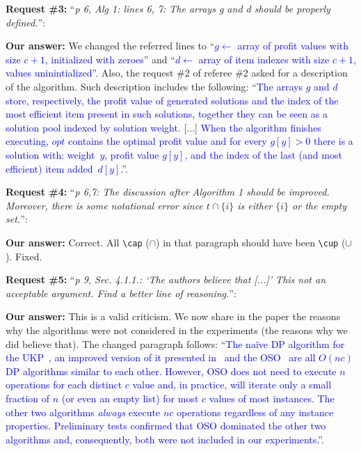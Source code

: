 \documentclass{elsarticle}
\begin{document}
\textbf{Request \#3:} ``\textit{p 6, Alg 1: lines 6, 7: The arrays g and d should be properly defined.}'':

\textbf{Our answer:} We changed the referred lines to ``\textcolor{blue}{\(g \leftarrow\) array of profit values with size \(c + 1\), initialized with zeroes}'' and ``\textcolor{blue}{\(d \leftarrow\) array of item indexes with size \(c + 1\), values uninintialized}''.
Also, the request \#2 of referee \#2 asked for a description of the algorithm.
Such description includes the following: ``\textcolor{blue}{The arrays \(g\) and \(d\) store, respectively, the profit value of generated solutions and the index of the most efficient item present in such solutions, together they can be seen as a solution pool indexed by solution weight.} [...] \textcolor{blue}{When the algorithm finishes executing, \(opt\) contains the optimal profit value and for every \(g[y] > 0\) there is a solution with: weight~\(y\), profit value \(g[y]\), and the index of the last (and most efficient) item added~\(d[y]\).}''.
\medskip

\textbf{Request \#4:} ``\textit{p 6,7: The discussion after Algorithm 1 should be improved. Moreover, there is some notational error since \(t \cap \{i\}\)  is either \(\{i\}\) or the empty set.}'':

\textbf{Our answer:} Correct. All \verb+\cap+ (\(\cap\)) in that paragraph should have been \verb+\cup+ (\(\cup\)). Fixed.
\medskip

\textbf{Request \#5:} ``\textit{p 9, Sec. 4.1.1.: `The authors believe that [...]' This not an acceptable argument. Find a better line of reasoning.}'':

\textbf{Our answer:} This is a valid criticism.
We now share in the paper the reasons why the algorithms were not considered in the experiments (the reasons why we did believe that).
The changed paragraph follows: ``\textcolor{blue}{The naïve DP algorithm for the UKP~\cite[p.~311]{tchu}, an improved version of it presented in~\cite[p.~221]{garfinkel} and the OSO~\cite[p.~15]{gg-66} are all \(O(nc)\) DP algorithms similar to each other. %
However, OSO does not need to execute \(n\) operations for each distinct \(c\) value and, in practice, will iterate only a small fraction of \(n\) (or even an empty list) for most \(c\) values of most instances.
The other two algorithms \emph{always} execute \(nc\) operations regardless of any instance properties.
Preliminary tests confirmed that OSO dominated the other two algorithms and, consequently, both were not included in our experiments.}''.
\medskip
\end{document}
